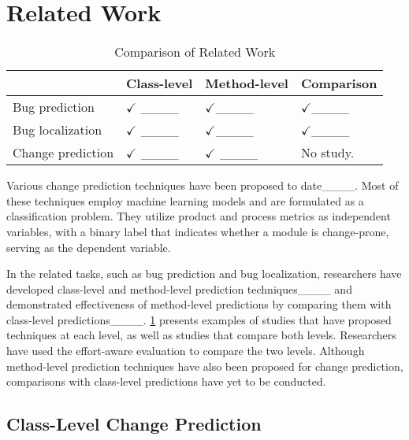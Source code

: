 \section{Related Work}
\label{s:rwork}
\begin{table}[tb]
    \caption{Comparison of Related Work}\label{tab:rwork}
    \centering
        \begin{tabular}{llll} \hline
              & Class-level & Method-level  & Comparison\\ \hline
            Bug prediction  & $\checkmark$ ____ & $\checkmark$____ & $\checkmark$____\\
            Bug localization & $\checkmark$ ____ & $\checkmark$____ & $\checkmark$____ \\
            Change prediction & $\checkmark$ ____ & $\checkmark$ ____ & No study.\\
            \hline
        \end{tabular}
\end{table}
Various change prediction techniques have been proposed to date____. 
Most of these techniques employ machine learning models and are formulated as a classification problem.
They utilize product and process metrics as independent variables, with a binary label that indicates whether a module is change-prone, serving as the dependent variable.

In the related tasks, such as bug prediction and bug localization, researchers have developed class-level and method-level prediction techniques____ and demonstrated effectiveness of method-level predictions by comparing them with class-level predictions____.
\cref{tab:rwork} presents examples of studies that have proposed techniques at each level, as well as studies that compare both levels.
Researchers have used the effort-aware evaluation to compare the two levels.
Although method-level prediction techniques have also been proposed for change prediction, comparisons with class-level predictions have yet to be conducted.

\subsection{Class-Level Change Prediction}

